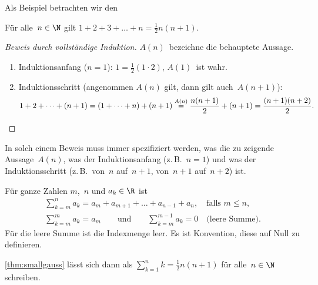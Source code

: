 \documentclass[a4paper]{article}
\begin{document}

Als Beispiel betrachten wir den

\begin{theorem}\label{thm:smallgauss}
    Für alle~$n \in \N$ gilt $1 + 2 + 3 + \dots + n = \frac{1}{2} n (n + 1)$.
\end{theorem}

\begin{proof}[Beweis durch vollständige Induktion]
    $A(n)$~bezeichne die behauptete Aussage.

    \begin{enumerate}
        \item Induktionsanfang ($n = 1$): $1 = \frac{1}{2} (1 \cdot 2)$, $A(1)$~ist wahr.
        \item Induktionsschritt (angenommen $A(n)$ gilt, dann gilt auch~$A(n + 1)$):
              \begin{equation*}
                  1 + 2 + \dots + (n + 1) = (1 + \dots + n) + (n + 1) \overset{A(n)}{=} \frac{n (n + 1)}{2} + (n + 1) = \frac{(n + 1) (n + 2)}{2}. \qedhere
              \end{equation*}
    \end{enumerate}
\end{proof}

\begin{remark}
    In solch einem Beweis muss immer spezifiziert werden, was die zu zeigende Aussage~$A(n)$, was der Induktionsanfang (z.\,B.~$n = 1$) und was der Induktionsschritt (z.\,B.\ von~$n$ auf~$n + 1$, von~$n + 1$ auf~$n + 2$) ist.
\end{remark}

\begin{notation}[Summenzeichen]
    Für ganze Zahlen $m$,~$n$ und $a_k \in \R$ ist
    \begin{gather*}
        \sum_{k=m}^n a_k = a_m + a_{m+1} + \dots + a_{n-1} + a_n, \quad\text{falls } m \leq n, \\
        \sum_{k=m}^m a_k = a_m \qquad\text{und}\qquad \sum_{k=m}^{m-1} a_k = 0 \quad\text{(leere Summe)}.
    \end{gather*}
    Für die leere Summe ist die Indexmenge leer. Es ist Konvention, diese auf Null zu definieren.
\end{notation}

\begin{example}
    \cref{thm:smallgauss} lässt sich dann als $\sum_{k=1}^n k = \frac{1}{2}n(n+1)$ für alle~$n \in \N$ schreiben.
\end{example}
\end{document}
